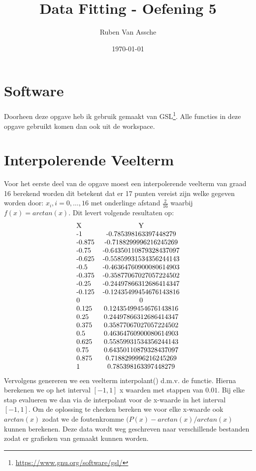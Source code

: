\documentclass[10pt,a4paper,twocolumn]{article}
\author{Ruben Van Assche}
\title{Data Fitting - Oefening 5}
\date{\today}
\begin{document}
\maketitle
\section{Software}
Doorheen deze opgave heb ik gebruik gemaakt van GSL\footnote{\url{https://www.gnu.org/software/gsl/}}. Alle functies in deze opgave gebruikt komen dan ook uit de \texttt{} workspace.
\section{Interpolerende Veelterm}
Voor het eerste deel van de opgave moest een interpolerende veelterm van graad 16 berekend worden dit betekent dat er 17 punten vereist zijn welke gegeven worden door: $x_{i},i = 0,\hdots,16$ met onderlinge afstand $\frac{2}{16}$ waarbij $f(x) = arctan(x)$. Dit levert volgende resultaten op:
$$
\begin{tabular}{ l c r }
  X & Y\\
-1 & -0.785398163397448279\\
-0.875 & -0.7188299996216245269\\
-0.75 & -0.64350110879328437097\\
-0.625 & -0.55859931534356244143\\
-0.5 & -0.46364760900080614903\\
-0.375 & -0.35877067027057224502\\
-0.25 & -0.24497866312686414347\\
-0.125 & -0.12435499454676143816\\
0 & 0\\
0.125 & 0.12435499454676143816\\
0.25 & 0.24497866312686414347\\
0.375 & 0.35877067027057224502\\
0.5 & 0.46364760900080614903\\
0.625 & 0.55859931534356244143\\
0.75 & 0.64350110879328437097\\
0.875 & 0.7188299996216245269\\
1 & 0.785398163397448279\\
\end{tabular}
$$
Vervolgens genereren we een veelterm interpolant(\texttt{}) d.m.v. de \texttt{} functie. Hierna berekenen we op het interval $[-1, 1]$ x waarden met stappen van $0.01$. Bij elke stap evalueren we dan via \texttt{} de interpolant voor de x-waarde in het interval $[-1,1]$. Om de oplossing te checken bereken we voor elke x-waarde ook $arctan(x)$ zodat we de foutenkromme $(P(x) - arctan(x)/arctan(x)$ kunnen berekenen. Deze data wordt weg geschreven naar verschillende bestanden zodat er grafieken van gemaakt kunnen worden.
\end{document}
